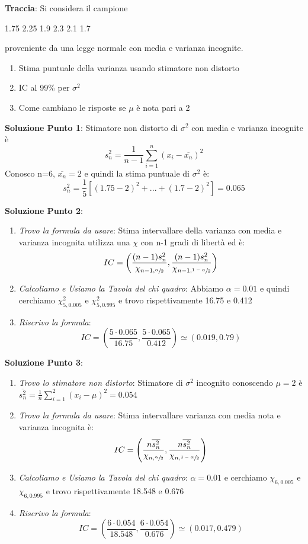 \textbf{Traccia}: Si considera il campione  
\begin{center}
    1.75 2.25 1.9 2.3 2.1 1.7
\end{center}
proveniente da una legge normale con media e varianza incognite.
\begin{enumerate}
    \item Stima puntuale della varianza usando stimatore non distorto
    \item IC al 99\% per $\sigma^2$
    \item Come cambiano le risposte se $\mu$ è nota pari a 2
\end{enumerate}

\ind \textbf{Soluzione Punto 1}: Stimatore non distorto di $\sigma^2$ con media e varianza incognite è $$s_n^2= \dfrac{1}{n-1} \sum_{i=1}^n (x_i - \overline{x_n})^2$$ Conosco n=6, $\overline{x_n}=2$ e quindi la stima puntuale di $\sigma^2$ è: $$s_n^2 = \frac{1}{5}[(1.75 - 2)^2 + ... + (1.7 - 2)^2] = 0.065$$

\ind \textbf{Soluzione Punto 2}:
\begin{enumerate}
    \item \textit{Trovo la formula da usare}: Stima intervallare della varianza con media e varianza incognita utilizza una $\chi$ con n-1 gradi di libertà ed è: $$IC =  \left( \dfrac{(n-1) s_n^2}{ \chi_{n-1, \sfrac{\alpha}{2}}}, \dfrac{(n-1) s_n^2}{ \chi_{n-1, \sfrac{ 1 - \alpha}{2}}} \right)$$
    \item \textit{Calcoliamo e Usiamo la Tavola del chi quadro}: Abbiamo $\alpha=0.01$ e quindi cerchiamo $\chi^2_{5, 0.005}$ e $\chi^2_{5, 0.995}$ e trovo rispettivamente 16.75 e 0.412
    \item \textit{Riscrivo la formula}: $$IC = \left( \dfrac{5 \cdot 0.065}{16.75}, \dfrac{5 \cdot 0.065}{0.412} \right) \simeq (0.019 , 0.79)$$
\end{enumerate}

\ind \textbf{Soluzione Punto 3}:
\begin{enumerate}
    \item \textit{Trovo lo stimatore non distorto}: Stimatore di $\sigma^2$ incognito conoscendo $\mu=2$ è $\overline{s_n^2}= \frac{1}{n} \sum_{i=1}^2 (x_i - \mu)^2 = 0.054$
    \item \textit{Trovo la formula da usare}: Stima intervallare varianza con media nota e varianza incognita è: $$IC = \left( \dfrac{n \overline{s_n^2}}{ \chi_{n, \sfrac{\alpha}{2}}}, \dfrac{n \overline{s_n^2}}{ \chi_{n, \sfrac{ 1 - \alpha}{2}}} \right)$$
    \item \textit{Calcoliamo e Usiamo la Tavola del chi quadro}: $\alpha=0.01$ e cerchiamo $\chi_{6, 0.005}$ e $\chi_{6, 0.995}$ e trovo rispettivamente 18.548 e 0.676
    \item \textit{Riscrivo la formula}: $$IC = \left( \dfrac{6 \cdot 0.054}{18.548}, \dfrac{6 \cdot 0.054}{0.676} \right) \simeq (0.017 , 0.479)$$
\end{enumerate}




